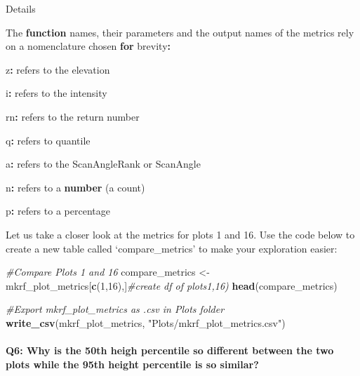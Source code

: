 \documentclass[
]{book}
\newenvironment{Shaded}{\begin{snugshade}}{\end{snugshade}}
\newcommand{\CommentTok}[1]{\textcolor[rgb]{0.56,0.35,0.01}{\textit{#1}}}
\newcommand{\ControlFlowTok}[1]{\textcolor[rgb]{0.13,0.29,0.53}{\textbf{#1}}}
\newcommand{\DecValTok}[1]{\textcolor[rgb]{0.00,0.00,0.81}{#1}}
\newcommand{\FunctionTok}[1]{\textcolor[rgb]{0.13,0.29,0.53}{\textbf{#1}}}
\newcommand{\NormalTok}[1]{#1}
\newcommand{\OtherTok}[1]{\textcolor[rgb]{0.56,0.35,0.01}{#1}}
\newcommand{\SpecialCharTok}[1]{\textcolor[rgb]{0.81,0.36,0.00}{\textbf{#1}}}
\newcommand{\StringTok}[1]{\textcolor[rgb]{0.31,0.60,0.02}{#1}}
\begin{document}
\begin{Shaded}
\begin{Highlighting}[]
\NormalTok{Details}

\NormalTok{The }\ControlFlowTok{function}\NormalTok{ names, their parameters and the output names of the metrics rely on a nomenclature chosen }\ControlFlowTok{for}\NormalTok{ brevity}\SpecialCharTok{:}

\NormalTok{z}\SpecialCharTok{:}\NormalTok{ refers to the elevation}

\NormalTok{i}\SpecialCharTok{:}\NormalTok{ refers to the intensity}

\NormalTok{rn}\SpecialCharTok{:}\NormalTok{ refers to the return number}

\NormalTok{q}\SpecialCharTok{:}\NormalTok{ refers to quantile}

\NormalTok{a}\SpecialCharTok{:}\NormalTok{ refers to the ScanAngleRank or ScanAngle}

\NormalTok{n}\SpecialCharTok{:}\NormalTok{ refers to a }\FunctionTok{number}\NormalTok{ (a count)}

\NormalTok{p}\SpecialCharTok{:}\NormalTok{ refers to a percentage}
\end{Highlighting}
\end{Shaded}

Let us take a closer look at the metrics for plots 1 and 16. Use the code below to create a new table called `compare\_metrics' to make your exploration easier:

\begin{Shaded}
\begin{Highlighting}[]
\CommentTok{\#Compare Plots 1 and 16}
\NormalTok{compare\_metrics }\OtherTok{\textless{}{-}}\NormalTok{  mkrf\_plot\_metrics[}\FunctionTok{c}\NormalTok{(}\DecValTok{1}\NormalTok{,}\DecValTok{16}\NormalTok{),]}\CommentTok{\#create df of plots1,16)}
\FunctionTok{head}\NormalTok{(compare\_metrics)}

\CommentTok{\#Export mkrf\_plot\_metrics as .csv in Plots folder}
\FunctionTok{write\_csv}\NormalTok{(mkrf\_plot\_metrics, }\StringTok{"Plots/mkrf\_plot\_metrics.csv"}\NormalTok{)}
\end{Highlighting}
\end{Shaded}

\hypertarget{q6-why-is-the-50th-heigh-percentile-so-different-between-the-two-plots-while-the-95th-height-percentile-is-so-similar}{%
\paragraph*{Q6: Why is the 50th heigh percentile so different between the two plots while the 95th height percentile is so similar?}\label{q6-why-is-the-50th-heigh-percentile-so-different-between-the-two-plots-while-the-95th-height-percentile-is-so-similar}}
\end{document}
